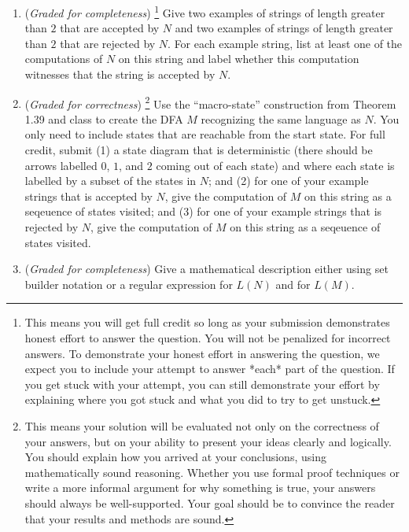 \documentclass[12pt, oneside]{article}
\newcommand{\gradeCorrect}{({\it Graded for correctness}) }
\newcommand{\gradeCorrectFirst}{\gradeCorrect\footnote{This means your solution 
will be evaluated not only on the correctness of your answers, but on your ability
to present your ideas clearly and logically. You should explain how you 
arrived at your conclusions, using
mathematically sound reasoning. Whether you use formal proof techniques or 
write a more informal argument
for why something is true, your answers should always be well-supported. 
Your goal should be to convince the
reader that your results and methods are sound.} }
\newcommand{\gradeComplete}{({\it Graded for completeness}) }
\newcommand{\gradeCompleteFirst}{\gradeComplete\footnote{This means you will 
get full credit so long as your submission demonstrates honest effort to 
answer the question. You will not be penalized for incorrect answers. 
To demonstrate your honest effort in answering the question, we 
expect you to include your attempt to answer *each* part of the question. 
If you get stuck with your attempt, you can still demonstrate 
your effort by explaining where you got stuck and what 
you did to try to get unstuck.} }
\begin{document}
\begin{enumerate}[wide, labelwidth=!, labelindent=0pt]

    \begin{enumerate}
      \item\gradeCompleteFirst Give two examples of strings of length greater than $2$ 
      that are accepted by $N$ and two examples of strings of length greater than $2$ 
      that are rejected by $N$. For each example string, list at least one of the 
      computations of $N$ on this string and 
      label whether this computation witnesses that the string is accepted by $N$.

      \item\gradeCorrectFirst Use the ``macro-state'' construction from Theorem 1.39 and class to create the DFA
      $M$ recognizing the same language as $N$. You only need to include states that are reachable from the start
      state. For full credit, submit (1) a state diagram that is deterministic (there should be arrows labelled $0$, $1$, and 
      $2$ coming out of each state) and where each state is labelled by a subset of the states in $N$; 
      and (2) for one of your example strings that is accepted by $N$, give the computation of $M$ on this string as a 
      seqeuence of states visited; and (3) for one of your example strings that is rejected by $N$, 
      give the computation of $M$ on this string as a seqeuence of states visited.

      \item\gradeComplete Give a mathematical description either using set builder notation or a regular expression
      for $L(N)$ and for $L(M)$.
    \end{enumerate}
\end{enumerate}
\end{document}
